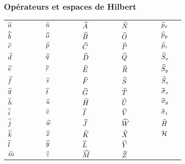 \documentclass{article}
\begin{document}
\subsubsection{Opérateurs et espaces de Hilbert}

\begin{table}[H]
    \centering
    \begin{tabular}{ll ll ll ll ll ll ll ll ll}
        $\widehat{a}$ & \raw{\ha} &&& $\widehat{n}$ & \raw{\hn} &&& $\widehat{A}$ & \raw{\hA} &&& $\widehat{N}$ & \raw{\hN} &&& $\widehat{p}_x$ & \raw{\hhpx}\\
        $\widehat{b}$ & \raw{\hb} &&& $\widehat{o}$ & \raw{\ho} &&& $\widehat{B}$ & \raw{\hB} &&& $\widehat{O}$ & \raw{\hO} &&& $\widehat{p}_y$ & \raw{\hhpy}\\
        $\widehat{c}$ & \raw{\hc} &&& $\widehat{p}$ & \raw{\hp} &&& $\widehat{C}$ & \raw{\hC} &&& $\widehat{P}$ & \raw{\hP} &&& $\widehat{p}_z$ & \raw{\hhpz}\\
        $\widehat{d}$ & \raw{\hd} &&& $\widehat{q}$ & \raw{\hq} &&& $\widehat{D}$ & \raw{\hD} &&& $\widehat{Q}$ & \raw{\hQ} &&& $\widehat{S}_x$ & \raw{\hhSx}\\
        $\widehat{e}$ & \raw{\he} &&& $\widehat{r}$ & \raw{\hr} &&& $\widehat{E}$ & \raw{\hE} &&& $\widehat{R}$ & \raw{\hR} &&& $\widehat{S}_y$ & \raw{\hhSy}\\
        $\widehat{f}$ & \raw{\hf} &&& $\widehat{s}$ & \raw{\hs} &&& $\widehat{F}$ & \raw{\hF} &&& $\widehat{S}$ & \raw{\hS} &&& $\widehat{S}_z$ & \raw{\hhSz}\\
        $\widehat{g}$ & \raw{\hg} &&& $\widehat{t}$ & \raw{\ht} &&& $\widehat{G}$ & \raw{\hG} &&& $\widehat{T}$ & \raw{\hT} &&& $\widehat{\sigma}_x$ & \raw{\hsigx}\\
        $\widehat{h}$ & \raw{\hh} &&& $\widehat{u}$ & \raw{\hu} &&& $\widehat{H}$ & \raw{\hH} &&& $\widehat{U}$ & \raw{\hU} &&& $\widehat{\sigma}_y$ & \raw{\hsigy}\\
        $\widehat{i}$ & \raw{\hi} &&& $\widehat{v}$ & \raw{\hv} &&& $\widehat{I}$ & \raw{\hI} &&& $\widehat{V}$ & \raw{\hV} &&& $\widehat{\sigma}_z$ & \raw{\hsigz}\\
        $\widehat{j}$ & \raw{\hj} &&& $\widehat{w}$ & \raw{\hw} &&& $\widehat{J}$ & \raw{\hJ} &&& $\widehat{W}$ & \raw{\hW} &&& $\widehat{H}$ & \raw{\ham}\\
        $\widehat{k}$ & \raw{\hk} &&& $\widehat{x}$ & \raw{\hx} &&& $\widehat{K}$ & \raw{\hK} &&& $\widehat{X}$ & \raw{\hX} &&& $\mathcal{H}$ & \raw{\hil}\\
        $\widehat{l}$ & \raw{\hl} &&& $\widehat{y}$ & \raw{\hy} &&& $\widehat{L}$ & \raw{\hL} &&& $\widehat{Y}$ & \raw{\hY} &&& \\
        $\widehat{m}$ & \raw{\hm} &&& $\widehat{z}$ & \raw{\hz} &&& $\widehat{M}$ & \raw{\hM} &&& $\widehat{Z}$ & \raw{\hZ} &&&
    \end{tabular}
\end{table}
\end{document}

